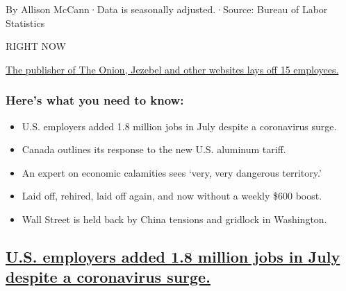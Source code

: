By Allison McCann·Data is seasonally adjusted.·Source: Bureau of Labor
Statistics

RIGHT NOW

\protect\hyperlink{the-publisher-of-the-onion-jezebel-and-other-websites-lays-off-15-employees}{The
publisher of The Onion, Jezebel and other websites lays off 15
employees.}

\hypertarget{heres-what-you-need-to-know}{%
\subsubsection{Here's what you need to
know:}\label{heres-what-you-need-to-know}}

\begin{itemize}
\item
  \protect\hyperlink{us-employers-added-1-8-million-jobs-in-july-despite-a-coronavirus-surge}{}

  U.S. employers added 1.8 million jobs in July despite a coronavirus
  surge.
\item
  \protect\hyperlink{canada-outlines-its-response-to-the-new-us-aluminum-tariff}{}

  Canada outlines its response to the new U.S. aluminum tariff.
\item
  \protect\hyperlink{an-expert-on-economic-calamities-sees-very-very-dangerous-territory}{}

  An expert on economic calamities sees `very, very dangerous
  territory.'
\item
  \protect\hyperlink{laid-off-rehired-laid-off-again-and-now-without-a-weekly-600-boost}{}

  Laid off, rehired, laid off again, and now without a weekly \$600
  boost.
\item
  \protect\hyperlink{wall-street-is-held-back-by-china-tensions-and-gridlock-in-washington}{}

  Wall Street is held back by China tensions and gridlock in Washington.
\end{itemize}

\hypertarget{us-employers-added-18-million-jobs-in-july-despite-a-coronavirus-surge}{%
\subsection{\texorpdfstring{\protect\hyperlink{us-employers-added-1-8-million-jobs-in-july-despite-a-coronavirus-surge}{U.S.
employers added 1.8 million jobs in July despite a coronavirus
surge.}}{U.S. employers added 1.8 million jobs in July despite a coronavirus surge.}}\label{us-employers-added-18-million-jobs-in-july-despite-a-coronavirus-surge}}

